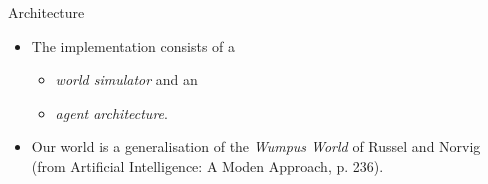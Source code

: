 \documentclass{beamer}
\begin{document}
   \begin{frame}{Architecture}
       \begin{itemize}
          \item The implementation consists of a
             \begin{itemize}
                \item \emph{world simulator} and an
                \item \emph{agent architecture}.
             \end{itemize}
             
          \medskip
          \item Our world is a generalisation of the \emph{Wumpus World} of Russel and Norvig (from Artificial Intelligence: A Moden Approach, p. 236).
       \end{itemize}
   \end{frame}
   
\end{document}
